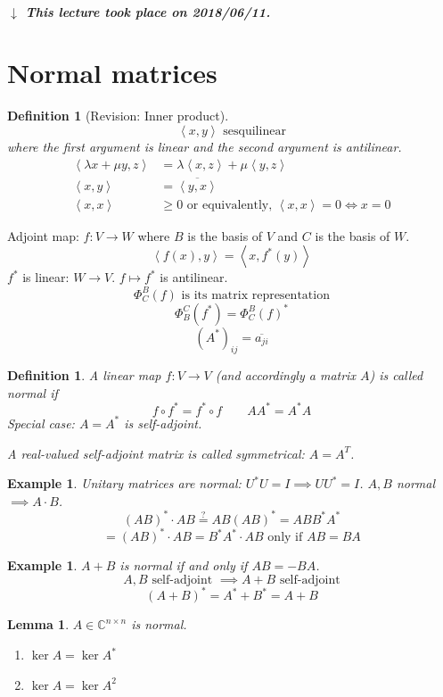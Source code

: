 \documentclass{article}
\newcounter{lecref}[section]
\numberwithin{lecref}{section}
\newtheorem{example}[lecref]{Example}
\newtheorem{definition}[lecref]{Definition}
\newtheorem{lemma}[lecref]{Lemma}
\newcommand{\angel}[1]{\left\langle#1\right\rangle}
\newcommand{\dateref}[1]{%
  \begin{mdframed}[backgroundcolor=gray!10,innerbottommargin=0pt,innertopmargin=0pt]
    \paragraph{\textit{$\downarrow$ This lecture took place on #1.}}%
  \end{mdframed}%
}
\begin{document}
\dateref{2018/06/11}

\section{Normal matrices} %

\begin{definition}[Revision: Inner product] %
  \[ \angel{x,y} \text{ sesquilinear} \]
  where the first argument is linear and the second argument is antilinear.
  \begin{align*}
    \angel{\lambda x + \mu y, z} &= \lambda \angel{x,z} + \mu \angel{y, z} \\
    \angel{x,y} &= \overline{\angel{y, x}} \\
    \angel{x,x} &\geq 0 \text{ or equivalently, } \angel{x,x} = 0 \iff x = 0
  \end{align*}
\end{definition}

Adjoint map: $f: V \to W$ where $B$ is the basis of $V$ and $C$ is the basis of $W$.
\[ \angel{f(x),y} = \angel{x,f^*(y)} \]
$f^*$ is linear: $W \to V$. $f \mapsto f^*$ is antilinear.
\[ \Phi_C^B(f) \text{ is its matrix representation} \]
\[ \Phi_B^C(f^*) = \Phi_C^B(f)^* \]
\[ (A^*)_{ij} = \overline{a_{ji}} \]

\begin{definition} %
  A linear map $f: V \to V$ (and accordingly a matrix $A$) is called \emph{normal} if
  \[ f \circ f^* = f^* \circ f \qquad A A^* = A^* A \]
  Special case: $A = A^*$ is self-adjoint.

  A real-valued self-adjoint matrix is called \emph{symmetrical}: $A = A^T$.
\end{definition}

\begin{example} %
  Unitary matrices are normal: $U^* U = I \implies U U^* = I$.
  $A, B$ normal $\implies A \cdot B$.
  \[ (AB)^* \cdot AB \overset?= AB (AB)^* = ABB^*A^* \]
  \[ = (AB)^* \cdot AB = B^* A^* \cdot  AB \text{ only if } AB = BA \]
\end{example}

\begin{example}
  $A + B$ is normal if and only if $AB = -BA$.
  \[ A,B \text{ self-adjoint } \implies A+B \text{ self-adjoint} \]
  \[ (A + B)^* = A^* + B^* = A + B \]
\end{example}

\begin{lemma} %
  $A \in \mathbb C^{n \times n}$ is normal.
  \begin{enumerate}
    \item $\ker{A} = \ker{A^*}$
    \item $\ker{A} = \ker{A^2}$
  \end{enumerate}
\end{lemma}
\end{document}
